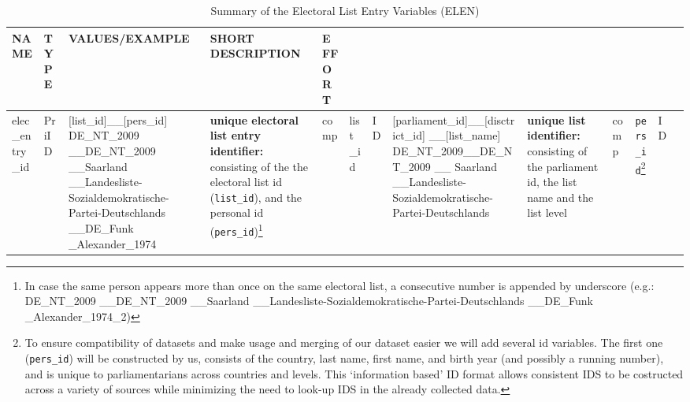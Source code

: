\documentclass{article}
\begin{document}
    \begin{longtable}
        {|m{}|
          m{}|
          m{}| 
          m{}| 
          m{}|}
\caption{Summary of the Electoral List Entry Variables (\gls{ELEN})} %
\label{ELENtab}
 \\\hline
 NAME & TYPE & VALUES/EXAMPLE & SHORT DESCRIPTION & EFFORT \\ \hline
        elec\_entry\_id & 
    PriID & 
    [list\_id]\_\_[pers\_id] \newline
        DE\_NT\_2009 \_\_DE\_NT\_2009 \_\_Saarland \_\_Landesliste-Sozialdemokratische-Partei-Deutschlands
     \_\_DE\_Funk \_Alexander\_1974
    &
    \textbf{unique electoral list entry identifier:} consisting of the the electoral list id (\texttt{list\_id}), and the personal id (\texttt{pers\_id})\footnote{In case the same person appears more than once on the same electoral list, a consecutive number is appended by underscore (e.g.: DE\_NT\_2009 \_\_DE\_NT\_2009 \_\_Saarland \_\_Landesliste-Sozialdemokratische-Partei-Deutschlands
     \_\_DE\_Funk \_Alexander\_1974\_2)} & 
        \gls{comp} &
        \hline
        list\_id & 
    ID  & 
    [parliament\_id]\_\_[disctrict\_id] \_\_[list\_name] \newline
      DE\_NT\_2009\_\_DE\_NT\_2009 \_\_ Saarland \_\_Landesliste-Sozialdemokratische-Partei-Deutschlands &
    \textbf{unique list identifier:} consisting of the parliament id, the list name and the list level & 
        \gls{comp} &
        \hline

         \texttt{pers\_id}\footnote{To ensure compatibility of datasets and make usage and merging of our dataset easier we will add several id variables. The first one (\texttt{pers\_id}) will be constructed by us, consists of the country, last name, first name, and birth year (and possibly a running number), and is unique to parliamentarians across countries and levels. This `information based' ID format allows consistent IDS to be costructed across a variety of sources while minimizing the need to look-up IDS in the already collected data.} &
        ID & 
    

\end{longtable}
\end{document}
